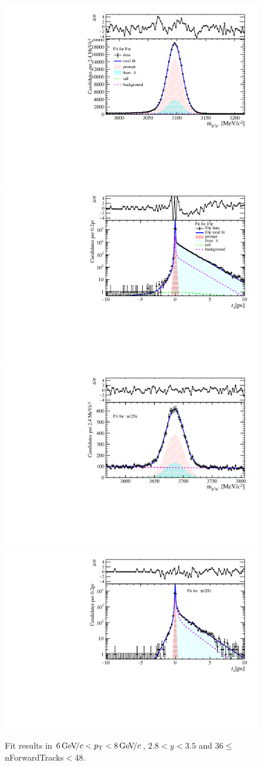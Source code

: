 \begin{figure}[H]
\begin{center}
\includegraphics[width=0.47\linewidth]{pdf/Jpsi/drawmassF/n4y2pt4.pdf}
\includegraphics[width=0.47\linewidth]{pdf/Jpsi/2DFitF/n4y2pt4.pdf}
\vspace*{-0.5cm}
\includegraphics[width=0.47\linewidth]{pdf/Psi2S/drawmassF/n4y2pt4.pdf}
\includegraphics[width=0.47\linewidth]{pdf/Psi2S/2DFitF/n4y2pt4.pdf}
\vspace*{-0.5cm}
\end{center}
\caption{Fit results in $6\text{\,Ge\kern -0.1em V\!/}c<p_{\mathrm{T}}<8\text{\,Ge\kern -0.1em V\!/}c$, $2.8<y<3.5$ and 36$\leq$nForwardTracks$<$48.}
\label{Fitn4y2pt4}
\end{figure}
